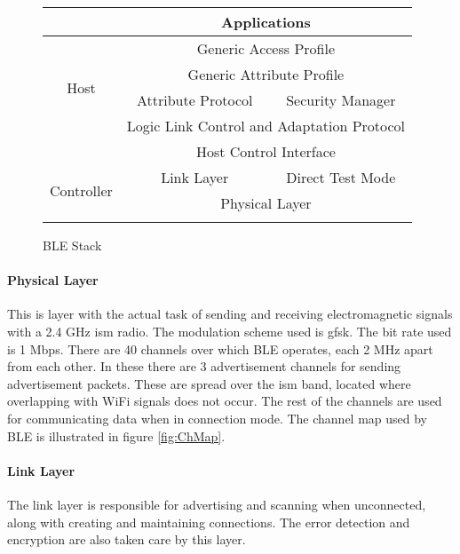 \begin{figure}[h]
\begin{center}
\setlength{\extrarowheight}{1.5pt}
\begin{tabular}{|c||c|c|}
\cline{2-3}
\multicolumn{1}{c|}{} &  \multicolumn{ 2}{c|}{Applications} \\ \hline
\multirow{4}{*}{Host} & \multicolumn{ 2}{c|}{Generic Access Profile} \\ \cline{ 2- 3}
 & \multicolumn{ 2}{c|}{Generic Attribute Profile} \\ \cline{ 2- 3}
 & \multicolumn{1}{c|}{Attribute Protocol} & \multicolumn{1}{c|}{Security Manager} \\ \cline{ 2- 3}
 & \multicolumn{ 2}{c|}{Logic Link Control and Adaptation Protocol} \\ \hline 
\multicolumn{1}{c|}{} & \multicolumn{ 2}{c|}{Host Control Interface} \\ \hline
\multirow{2}{*}{Controller} & \multicolumn{1}{c|}{Link Layer} & \multicolumn{1}{c|}{Direct Test Mode} \\ \cline{ 2- 3}
 & \multicolumn{ 2}{c|}{Physical Layer} \\ \hline
\multicolumn{ 1}{c}{} & \multicolumn{1}{m{4cm}}{} & \multicolumn{1}{m{4cm}}{} \\ 
\end{tabular}
\end{center}
\vspace{-30pt}
\caption{BLE Stack}
\label{fig:StackBLE}
\vspace{-10pt}
\end{figure}

\paragraph{Physical Layer}
This is layer with the actual task of sending and receiving electromagnetic signals with a 2.4 GHz \gls{ism} radio. The modulation scheme used is \gls{gfsk}. The bit rate used is 1 Mbps. There are 40 channels over which BLE operates, each 2 MHz apart from each other. In these there are 3 advertisement channels for sending advertisement packets. These are spread over the \gls{ism} band, located where overlapping with WiFi signals does not occur. The rest of the channels are used for communicating data when in connection mode. The channel map used by BLE is illustrated in figure \ref{fig:ChMap}.

\paragraph{Link Layer}
The link layer is responsible for advertising and scanning when unconnected, along with creating and maintaining connections. The error detection and encryption are also taken care by this layer. 

